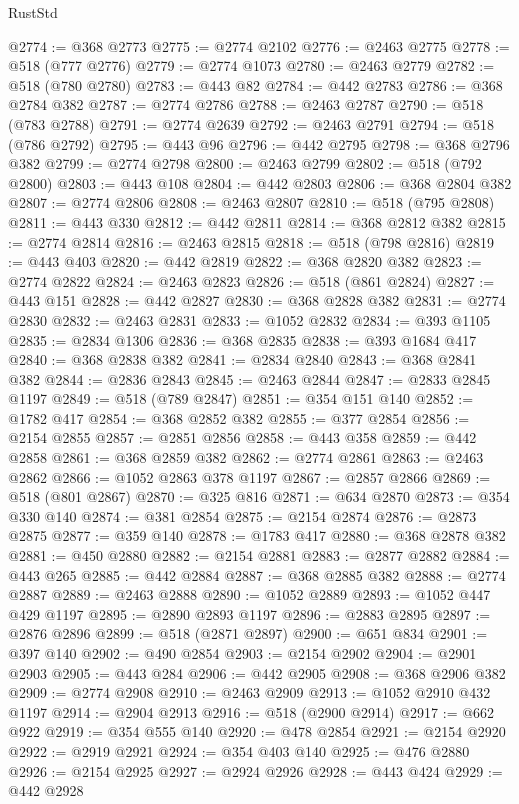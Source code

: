 \begin{lexlean}{RustStd}
\begin{coremodule}
@2774 := @368 @2773
@2775 := @2774 @2102
@2776 := @2463 @2775
@2778 := @518 (@777 @2776)
@2779 := @2774 @1073
@2780 := @2463 @2779
@2782 := @518 (@780 @2780)
@2783 := @443 @82
@2784 := @442 @2783
@2786 := @368 @2784 @382
@2787 := @2774 @2786
@2788 := @2463 @2787
@2790 := @518 (@783 @2788)
@2791 := @2774 @2639
@2792 := @2463 @2791
@2794 := @518 (@786 @2792)
@2795 := @443 @96
@2796 := @442 @2795
@2798 := @368 @2796 @382
@2799 := @2774 @2798
@2800 := @2463 @2799
@2802 := @518 (@792 @2800)
@2803 := @443 @108
@2804 := @442 @2803
@2806 := @368 @2804 @382
@2807 := @2774 @2806
@2808 := @2463 @2807
@2810 := @518 (@795 @2808)
@2811 := @443 @330
@2812 := @442 @2811
@2814 := @368 @2812 @382
@2815 := @2774 @2814
@2816 := @2463 @2815
@2818 := @518 (@798 @2816)
@2819 := @443 @403
@2820 := @442 @2819
@2822 := @368 @2820 @382
@2823 := @2774 @2822
@2824 := @2463 @2823
@2826 := @518 (@861 @2824)
@2827 := @443 @151
@2828 := @442 @2827
@2830 := @368 @2828 @382
@2831 := @2774 @2830
@2832 := @2463 @2831
@2833 := @1052 @2832
@2834 := @393 @1105
@2835 := @2834 @1306
@2836 := @368 @2835
@2838 := @393 @1684 @417
@2840 := @368 @2838 @382
@2841 := @2834 @2840
@2843 := @368 @2841 @382
@2844 := @2836 @2843
@2845 := @2463 @2844
@2847 := @2833 @2845 @1197
@2849 := @518 (@789 @2847)
@2851 := @354 @151 @140
@2852 := @1782 @417
@2854 := @368 @2852 @382
@2855 := @377 @2854
@2856 := @2154 @2855
@2857 := @2851 @2856
@2858 := @443 @358
@2859 := @442 @2858
@2861 := @368 @2859 @382
@2862 := @2774 @2861
@2863 := @2463 @2862
@2866 := @1052 @2863 @378 @1197
@2867 := @2857 @2866
@2869 := @518 (@801 @2867)
@2870 := @325 @816
@2871 := @634 @2870
@2873 := @354 @330 @140
@2874 := @381 @2854
@2875 := @2154 @2874
@2876 := @2873 @2875
@2877 := @359 @140
@2878 := @1783 @417
@2880 := @368 @2878 @382
@2881 := @450 @2880
@2882 := @2154 @2881
@2883 := @2877 @2882
@2884 := @443 @265
@2885 := @442 @2884
@2887 := @368 @2885 @382
@2888 := @2774 @2887
@2889 := @2463 @2888
@2890 := @1052 @2889
@2893 := @1052 @447 @429 @1197
@2895 := @2890 @2893 @1197
@2896 := @2883 @2895
@2897 := @2876 @2896
@2899 := @518 (@2871 @2897)
@2900 := @651 @834
@2901 := @397 @140
@2902 := @490 @2854
@2903 := @2154 @2902
@2904 := @2901 @2903
@2905 := @443 @284
@2906 := @442 @2905
@2908 := @368 @2906 @382
@2909 := @2774 @2908
@2910 := @2463 @2909
@2913 := @1052 @2910 @432 @1197
@2914 := @2904 @2913
@2916 := @518 (@2900 @2914)
@2917 := @662 @922
@2919 := @354 @555 @140
@2920 := @478 @2854
@2921 := @2154 @2920
@2922 := @2919 @2921
@2924 := @354 @403 @140
@2925 := @476 @2880
@2926 := @2154 @2925
@2927 := @2924 @2926
@2928 := @443 @424
@2929 := @442 @2928

\end{coremodule}
\end{lexlean}
